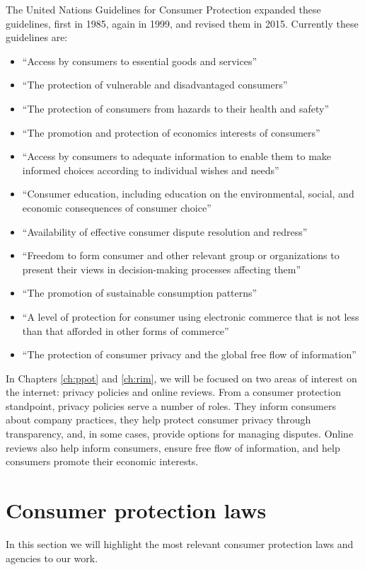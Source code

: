 The United Nations Guidelines for Consumer Protection expanded these guidelines, first in 1985, again in 1999, and revised them in 2015. Currently these guidelines are: \cite{un2003conpro}
\begin{itemize}
\item ``Access by consumers to essential goods and services''
\item ``The protection of vulnerable and disadvantaged consumers''
\item ``The protection of consumers from hazards to their health and safety''
\item ``The promotion and protection of economics interests of consumers''
\item ``Access by consumers to adequate information to enable them to make informed choices  according to individual wishes and needs''
\item ``Consumer education, including education on the environmental, social, and economic consequences of consumer choice''
\item ``Availability of effective consumer dispute resolution and redress''
\item ``Freedom to form consumer and other relevant group or organizations to present their views in decision-making processes affecting them''
\item ``The promotion of sustainable consumption patterns''
\item ``A level of protection for consumer using electronic commerce that is not less than that afforded in other forms of commerce''
\item ``The protection of consumer privacy and the global free flow of information''
\end{itemize}

In Chapters \ref{ch:ppot} and \ref{ch:rim}, we will be focused on two areas of interest on the internet: privacy policies and online reviews. From a consumer protection standpoint, privacy policies serve a number of roles. They inform consumers about company practices, they help protect consumer privacy through transparency, and, in some cases, provide options for managing disputes. Online reviews also help inform consumers, ensure free flow of information, and help consumers promote their economic interests. 


\section{Consumer protection laws} \label{sec:background:laws}
In this section we will highlight the most relevant consumer protection laws and agencies to our work.


